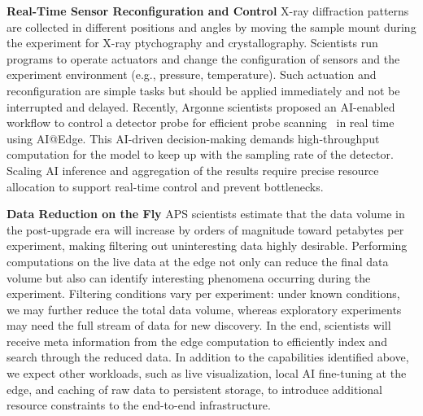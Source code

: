 


\textbf{Real-Time Sensor Reconfiguration and Control}
%
X-ray diffraction patterns are collected
in different positions and angles by moving the sample mount during the experiment for X-ray ptychography and crystallography. Scientists run programs to operate actuators and change the configuration of sensors and the experiment environment (e.g., pressure, temperature). Such actuation and reconfiguration are simple tasks but should be applied immediately and not be interrupted and delayed. Recently, Argonne scientists proposed an AI-enabled workflow to control a detector probe for efficient probe scanning~\cite{kandel2023demonstration} in real time using AI@Edge. This AI-driven decision-making demands high-throughput computation for the model to keep up with the sampling rate of the detector. Scaling AI inference and aggregation of the results require precise resource allocation to support real-time control and prevent bottlenecks. 

\textbf{Data Reduction on the Fly}
%
APS scientists estimate that the data volume in the post-upgrade era will increase by orders of magnitude toward petabytes per experiment, making filtering out uninteresting data highly desirable. Performing computations on the live data at the edge not only can reduce the final data volume but also can identify interesting phenomena occurring during the experiment. Filtering conditions vary per experiment: under known conditions, we may further reduce the total data volume, whereas exploratory experiments may need the full stream of data for new discovery. In the end, scientists will receive meta information from the edge computation to efficiently index and search through the reduced data. In addition to the capabilities identified above, we expect other workloads, such as live visualization, local AI fine-tuning at the edge, and caching of raw data to persistent storage, to introduce additional resource constraints to the end-to-end infrastructure.

